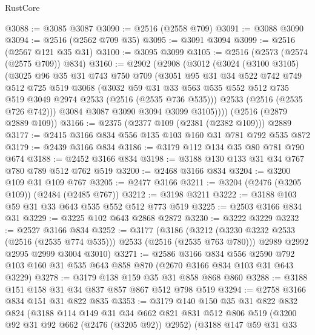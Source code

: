 \begin{lexlean}{RustCore}
\begin{coremodule}
@3088 := @3085 @3087
@3090 := @2516 (@2558 @709)
@3091 := @3088 @3090
@3094 := @2516 (@2562 @709 @35)
@3095 := @3091 @3094
@3099 := @2516 (@2567 @121 @35 @31)
@3100 := @3095 @3099
@3105 := @2516 (@2573 (@2574 (@2575 @709)) @834)
@3160 := @2902
    (@2908
      (@3012
        (@3024
          (@3100 @3105)
          (@3025
            @96
            @35
            @31
            @743
            @750
            @709
            (@3051
              @95
              @31
              @34
              @522
              @742
              @749
              @512
              @725
              @519
              @3068
              (@3032
                @59
                @31
                @33
                @563
                @535
                @552
                @512
                @735
                @519
                @3049
                @2974
                @2533
                (@2516 (@2535 @736 @535)))
              @2533
              (@2516 (@2535 @726 @742)))
            @3084
            @3087
            @3090
            @3094
            @3099
            @3105))))
    (@2516 (@2879 @2889 @109))
@3166 := @2375 (@2377 @109 (@2381 (@2382 @109))) @2889
@3177 := @2415 @3166 @834 @556 @135 @103 @160 @31 @781 @792 @535 @872
@3179 := @2439 @3166 @834
@3186 := @3179 @112 @134 @35 @80 @781 @790 @674
@3188 := @2452 @3166 @834
@3198 := @3188 @130 @133 @31 @34 @767 @780 @789 @512 @762 @519
@3200 := @2468 @3166 @834
@3204 := @3200 @109 @31 @109 @767
@3205 := @2477 @3166
@3211 := @3204 (@2476 (@3205 @109)) (@2484 (@2485 @767))
@3212 := @3198 @3211
@3222 := @3188 @103 @59 @31 @33 @643 @535 @552 @512 @773 @519
@3225 := @2503 @3166 @834 @31
@3229 := @3225 @102 @643 @2868 @2872
@3230 := @3222 @3229
@3232 := @2527 @3166 @834
@3252 := @3177
    (@3186
      (@3212 (@3230 @3232 @2533 (@2516 (@2535 @774 @535))) @2533 (@2516 (@2535 @763 @780)))
      @2989
      @2992
      @2995
      @2999
      @3004
      @3010)
@3271 := @2586
    @3166
    @834
    @556
    @2590
    @792
    @103
    @160
    @31
    @535
    @643
    @858
    @870
    (@2670 @3166 @834 @103 @31 @643 @3229)
@3278 := @3179 @138 @159 @35 @31 @858 @868 @860
@3288 := @3188 @151 @158 @31 @34 @837 @857 @867 @512 @798 @519
@3294 := @2758 @3166 @834 @151 @31 @822 @835
@3353 := @3179
    @140
    @150
    @35
    @31
    @822
    @832
    @824
    (@3188
      @114
      @149
      @31
      @34
      @662
      @821
      @831
      @512
      @806
      @519
      (@3200 @92 @31 @92 @662 (@2476 (@3205 @92)) @2952)
      (@3188
        @147
        @59
        @31
        @33

\end{coremodule}
\end{lexlean}
